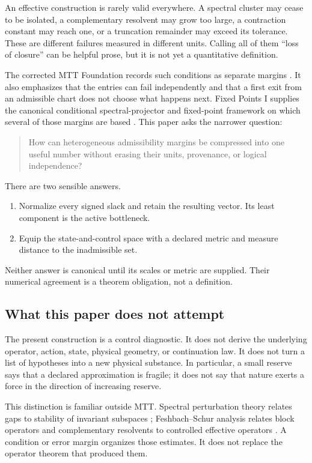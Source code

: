 \documentclass[11pt]{article}
\theoremstyle{definition}
\theoremstyle{remark}
\begin{document}
An effective construction is rarely valid everywhere.  A spectral cluster
may cease to be isolated, a complementary resolvent may grow too large, a
contraction constant may reach one, or a truncation remainder may exceed its
tolerance.  These are different failures measured in different units.
Calling all of them ``loss of closure'' can be helpful prose, but it is not
yet a quantitative definition.

The corrected MTT Foundation records such conditions as separate margins
\cite{MTTFoundation2026}.  It also emphasizes that the entries can fail
independently and that a first exit from an admissible chart does not choose
what happens next.  Fixed Points I supplies the canonical conditional
spectral-projector and fixed-point framework on which several of those
margins are based \cite{FixedPointsI2026}.  This paper asks the narrower
question:
\begin{quote}
How can heterogeneous admissibility margins be compressed into one useful
number without erasing their units, provenance, or logical independence?
\end{quote}

There are two sensible answers.
\begin{enumerate}[leftmargin=2em]
\item Normalize every signed slack and retain the resulting vector.  Its
      least component is the active bottleneck.
\item Equip the state-and-control space with a declared metric and measure
      distance to the inadmissible set.
\end{enumerate}
Neither answer is canonical until its scales or metric are supplied.
Their numerical agreement is a theorem obligation, not a definition.

\subsection{What this paper does not attempt}

The present construction is a control diagnostic.  It does not derive the
underlying operator, action, state, physical geometry, or continuation law.
It does not turn a list of hypotheses into a new physical substance.  In
particular, a small reserve says that a declared approximation is fragile;
it does not say that nature exerts a force in the direction of increasing
reserve.

This distinction is familiar outside MTT.  Spectral perturbation theory
relates gaps to stability of invariant subspaces
\cite{Kato1966,DavisKahan1970}; Feshbach--Schur analysis relates block
operators and complementary resolvents to controlled effective operators
\cite{BachEtAl2003}.  A condition or error margin organizes those estimates.
It does not replace the operator theorem that produced them.
\end{document}
